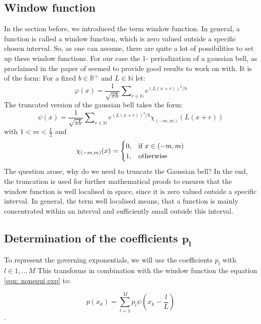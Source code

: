 \documentclass[11pt]{report} %
\begin{document}
\subsection{Window function}
In the section before, we introduced the term window function.
In general, a function is called a window function, which is zero valued outside a specific chosen interval.
So, as one can assume, there are quite a lot of possibilities to set up these window functions.
For our case the 1- periodization of a gaussian bell, as proclaimed in the paper of \cite{Peter2011} seemed to provide good results to work on with.
It is of the form: 
For a fixed $b \in \mathbb{R}^+$ and $L \in{\mathbb{N}}$ let:
\begin{equation}
\varphi(x)= \frac{1}{\sqrt{\pi b}} \sum\nolimits_{r \in \mathbb{N}}  e^{(L(x+r))^2/b}
\end{equation}
The truncated version of the gaussian bell takes the form: 
\begin{equation}
\psi(x)= \frac{1}{\sqrt{\pi b}} \sum\nolimits_{r \in \mathbb{N}}  e^{(L(x+r))^2/b}\chi_{(-m,m)}(L(x+r))
\end{equation}
with $1<m < \frac{L}{2}$ and
\begin{equation}
    \chi_{(-m,m)}(x)=
    \begin{cases}
      0, & \text{if}\ x\in (-m,m) \\
      1, & \text{otherwise}
    \end{cases}\notag
\end{equation} 
The question arose, why do we need to truncate the Gaussian bell? 
In the end, the truncation is used for further mathematical proofs to ensures that the window function is well localised in space, since it is zero valued outside a specific interval.
In general, the term well localised means, that a function is mainly concentrated within an interval and sufficiently small outside this interval.

\subsection{Determination of the coefficients $\bm{p_l}$}
To represent the governing exponentials, we will use the coefficients $p_l$ with $l \in{1,..,M}$    
This transforms in combination with the window function the equation \eqref{eqn: nonequi exp} to: 

\begin{equation}
p(x_{k})=\sum\limits_{l=1}^M p_{l}\psi(x_{k}-\frac{l}{L})\label{eqn: linear system}
\end{equation}.
\end{document}
